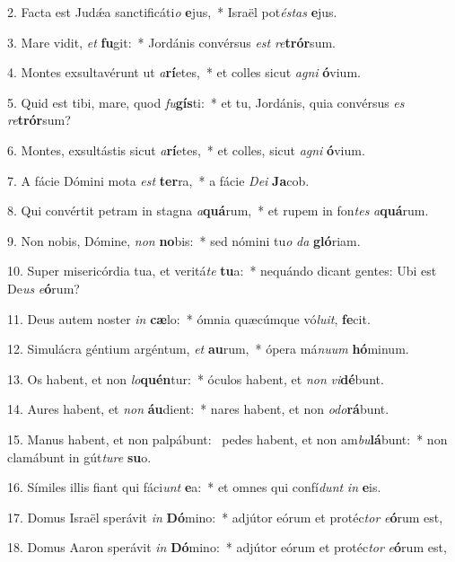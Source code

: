 2. Facta est Judǽa sanctificáti\textit{o} \textbf{e}jus,~*  Israël pot\textit{és}\textit{tas} \textbf{e}jus.\

3. Mare vidit, \textit{et} \textbf{fu}git:~*  Jordánis convérsus \textit{est} \textit{re}\textbf{trór}sum.\

4. Montes exsultavérunt ut \textit{a}\textbf{rí}etes,~*  et colles sicut \textit{a}\textit{gni} \textbf{ó}vium.\

5. Quid est tibi, mare, quod \textit{fu}\textbf{gís}ti:~*  et tu, Jordánis, quia convérsus \textit{es} \textit{re}\textbf{trór}sum?\

6. Montes, exsultástis sicut \textit{a}\textbf{rí}etes,~*  et colles, sicut \textit{a}\textit{gni} \textbf{ó}vium.\

7. A fácie Dómini mota \textit{est} \textbf{ter}ra,~*  a fácie \textit{De}\textit{i} \textbf{Ja}cob.\

8. Qui convértit petram in stagna \textit{a}\textbf{quá}rum,~*  et rupem in fon\textit{tes} \textit{a}\textbf{quá}rum.\

9. Non nobis, Dómine, \textit{non} \textbf{no}bis:~*  sed nómini tu\textit{o} \textit{da} \textbf{gló}riam.\

10. Super misericórdia tua, et veritá\textit{te} \textbf{tu}a:~*  nequándo dicant gentes: Ubi est De\textit{us} \textit{e}\textbf{ó}rum?\

11. Deus autem noster \textit{in} \textbf{cæ}lo:~*  ómnia quæcúmque vó\textit{lu}\textit{it}, \textbf{fe}cit.\

12. Simulácra géntium argéntum, \textit{et} \textbf{au}rum,~*  ópera má\textit{nu}\textit{um} \textbf{hó}minum.\

13. Os habent, et non \textit{lo}\textbf{quén}tur:~*  óculos habent, et \textit{non} \textit{vi}\textbf{dé}bunt.\

14. Aures habent, et \textit{non} \textbf{áu}dient:~*  nares habent, et non \textit{o}\textit{do}\textbf{rá}bunt.\

15. Manus habent, et non palpábunt: \dag\  pedes habent, et non am\textit{bu}\textbf{lá}bunt:~*  non clamábunt in gút\textit{tu}\textit{re} \textbf{su}o.\

16. Símiles illis fiant qui fáci\textit{unt} \textbf{e}a:~*  et omnes qui confí\textit{dunt} \textit{in} \textbf{e}is.\

17. Domus Israël sperávit \textit{in} \textbf{Dó}mino:~*  adjútor eórum et protéc\textit{tor} \textit{e}\textbf{ó}rum est,\

18. Domus Aaron sperávit \textit{in} \textbf{Dó}mino:~*  adjútor eórum et protéc\textit{tor} \textit{e}\textbf{ó}rum est,\

